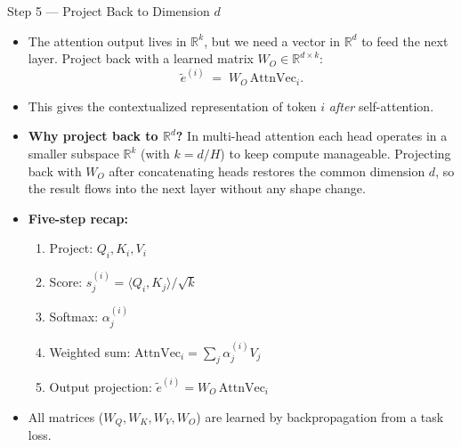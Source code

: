 \begin{frame}{Step 5 --- Project Back to Dimension $d$}
\begin{itemize}
\item The attention output lives in $\mathbb{R}^{k}$, but we need a vector in $\mathbb{R}^{d}$ to feed the next layer. Project back with a learned matrix $W_{O} \in \mathbb{R}^{d \times k}$:
\[
   \tilde{e}^{(i)} \;=\; W_{O}\,\text{AttnVec}_{i}.
\]

\medskip
\item This gives the contextualized representation of token $i$ \emph{after} self-attention.

\medskip
\item \textbf{Why project back to $\mathbb{R}^{d}$?} In multi-head attention each head operates in a smaller subspace $\mathbb{R}^{k}$ (with $k=d/H$) to keep compute manageable. Projecting back with $W_O$ after concatenating heads restores the common dimension $d$, so the result flows into the next layer without any shape change.

\medskip
\item \textbf{Five-step recap:}
\begin{enumerate}
    \item Project: $Q_i, K_i, V_i$
    \item Score: $s_{j}^{(i)} = \langle Q_i, K_j\rangle / \sqrt{k}$
    \item Softmax: $\alpha_{j}^{(i)}$
    \item Weighted sum: $\text{AttnVec}_i = \sum_j \alpha_{j}^{(i)} V_j$
    \item Output projection: $\tilde{e}^{(i)} = W_O\, \text{AttnVec}_i$
\end{enumerate}

\medskip
\item All matrices ($W_Q, W_K, W_V, W_O$) are learned by backpropagation from a task loss.
\end{itemize}
\end{frame}

